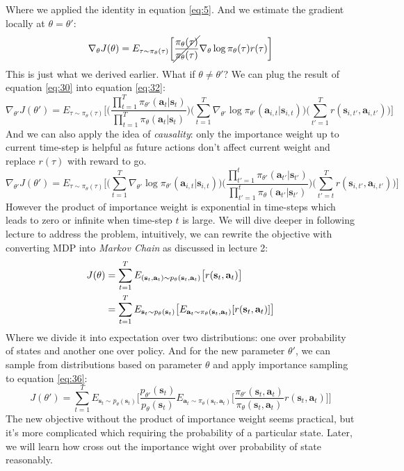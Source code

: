 \documentclass{tufte-handout}
\newcommand{\s}{\mathbf{s}}
\newcommand{\act}{\mathbf{a}}
\begin{document}
Where we applied the identity in equation \ref{eq:5}. And we estimate the gradient locally at $\theta = \theta'$:
\begin{equation}
\label{eq:33}
\nabla _ {\theta} J(\theta)
= E_{\tau \sim \pi_{\theta}(\tau)} \bigg[\cancel{\frac{\pi_{\theta} (\tau)}{\pi_{\theta}(\tau)}}
\nabla _{\theta} \log \pi_{\theta}(\tau) r(\tau) \bigg]
\end{equation}
This is just what we derived earlier. What if $\theta \neq \theta'$? We can plug the result of equation \ref{eq:30} into equation \ref{eq:32}:
\begin{equation}
\label{eq:34}
\nabla _ {\theta'} J(\theta')
= E _{\tau \sim \pi_{\theta}(\tau)} \bigg[
\bigg( \frac{\prod _{t=1}^T \pi_{\theta'} (\act_t | \s_t)}{\prod _{t=1}^T \pi_\theta (\act_t | \s_t)}\bigg)
\bigg( \sum_{t=1}^T \nabla_{\theta'} \log \pi_{\theta'}(\act_{i,t}| \s_{i,t}) \bigg)
  \Big( \sum_{t'=1}^T r(\s_{i, t'}, \act_{i, t'}) \Big) \bigg]
\end{equation}
And we can also apply the idea of \emph{causality}: only the importance weight up to current time-step is helpful as future actions don't affect current weight and replace $r(\tau)$ with reward to go.
\begin{equation}
\label{eq:35}
\nabla _ {\theta'} J(\theta')
= E _{\tau \sim \pi_{\theta}(\tau)} \bigg[
\bigg( \sum_{t=1}^T \nabla_{\theta'} \log \pi_{\theta'}(\act_{i,t}| \s_{i,t}) \bigg)
\bigg( \frac{\prod _{t'=1}^t \pi_{\theta'} (\act_{t'} | \s_{t'})}{\prod _{t'=1}^t \pi_\theta (\act_{t'} | \s_{t'})}\bigg)
  \Big( \sum_{t'=t}^T r(\s_{i, t'}, \act_{i, t'}) \Big) \bigg]
\end{equation}
However the product of importance weight is exponential in time-steps which leads to zero or infinite when time-step $t$ is large. We will dive deeper in following lecture to address the problem, intuitively, we can rewrite the objective with converting MDP into \emph{Markov Chain} as discussed in lecture 2:
\begin{align}
\label{eq:36}
J(\theta) & = \sum_{t=1} ^ T E_{(\s_t, \act_t)\sim p_\theta (\s_t, \act_t)} \big[r(\s_t, \act_t) \big] \notag \\
& = \sum_{t=1} ^ T E_{\s_t \sim p_\theta (\s_t)} \big[ E_{\act_t \sim \pi_\theta (\s_t, \act_t)}[r(\s_t, \act_t) ] \big]
\end{align}
Where we divide it into expectation over two distributions: one over probability of states and another one over policy. And for the new parameter $\theta'$,
we can sample from distributions based on parameter $\theta$ and apply importance sampling to equation \ref{eq:36}:
\begin{equation}
\label{eq:37}
J(\theta')
 = \sum_{t=1} ^ T E_{\s_t \sim p_\theta (\s_t)} \bigg[ \frac{p_{\theta'} (\s_t)}{p_\theta(\s_t)}
 E_{\act_t \sim \pi_\theta (\s_t, \act_t)}\bigg[\frac{\pi_{\theta'} (\s_t, \act_t)}{\pi_\theta (\s_t, \act_t)} r(\s_t, \act_t) \bigg] \bigg]
\end{equation}
The new objective without the product of importance weight seems practical, but it's more complicated which requiring the probability of a particular state. Later, we will learn how cross out the importance wight over probability of state reasonably.
\end{document}
